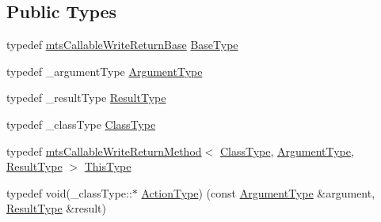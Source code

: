 \subsection*{Public Types}
\begin{DoxyCompactItemize}
\item 
typedef \hyperlink{classmts_callable_write_return_base}{mts\+Callable\+Write\+Return\+Base} \hyperlink{classmts_callable_write_return_method_a324edde317d1c130c8f88c2f3ff71ed2}{Base\+Type}
\item 
typedef \+\_\+argument\+Type \hyperlink{classmts_callable_write_return_method_a694e2620eacec8300718daa334cccd01}{Argument\+Type}
\item 
typedef \+\_\+result\+Type \hyperlink{classmts_callable_write_return_method_aad7815169b189d2f7a0e240ea134fd97}{Result\+Type}
\item 
typedef \+\_\+class\+Type \hyperlink{classmts_callable_write_return_method_a51dbe6298941ab172d83182c8188092d}{Class\+Type}
\item 
typedef \hyperlink{classmts_callable_write_return_method}{mts\+Callable\+Write\+Return\+Method}$<$ \hyperlink{classmts_callable_write_return_method_a51dbe6298941ab172d83182c8188092d}{Class\+Type}, \hyperlink{classmts_callable_write_return_method_a694e2620eacec8300718daa334cccd01}{Argument\+Type}, \hyperlink{classmts_callable_write_return_method_aad7815169b189d2f7a0e240ea134fd97}{Result\+Type} $>$ \hyperlink{classmts_callable_write_return_method_adc8a7a7a10c5aa9fe1e63b4e667c5d6c}{This\+Type}
\item 
typedef void(\+\_\+class\+Type\+::$\ast$ \hyperlink{classmts_callable_write_return_method_a650562eae4db20a5cfbbff0f9f7e1a0a}{Action\+Type}) (const \hyperlink{classmts_callable_write_return_method_a694e2620eacec8300718daa334cccd01}{Argument\+Type} \&argument, \hyperlink{classmts_callable_write_return_method_aad7815169b189d2f7a0e240ea134fd97}{Result\+Type} \&result)
\end{DoxyCompactItemize}
